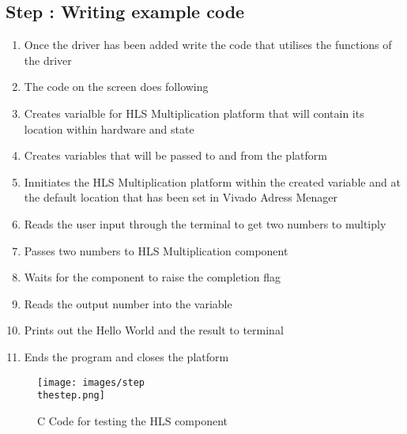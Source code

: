 \documentclass{article}
\newcounter{step}
\newcommand{\step}[3]{
    \refstepcounter{step}
    \subsection{Step \thestep: #1}
    \begin{enumerate}
        #2
    \end{enumerate}
    \begin{figure}[h!]
        \centering
        \texttt{[image: images/step\\thestep.png]}
        \caption{#3}
        \label{fig:step\thestep}
    \end{figure}
    \FloatBarrier
    \newpage
}
\begin{document}
\step{Writing example code}{
    \item Once the driver has been added write the code that utilises the functions of the driver
    \item The code on the screen does following
    \item Creates varialble for HLS Multiplication platform that will contain its location within hardware and state
    \item Creates variables that will be passed to and from the platform
    \item Innitiates the HLS Multiplication platform within the created variable and at the default location that has been set in Vivado Adress Menager
    \item Reads the user input through the terminal to get two numbers to multiply
    \item Passes two numbers to HLS Multiplication component
    \item Waits for the component to raise the completion flag
    \item Reads the output number into the variable
    \item Prints out the Hello World and the result to terminal
    \item Ends the program and closes the platform

}{C Code for testing the HLS component}
\end{document}
